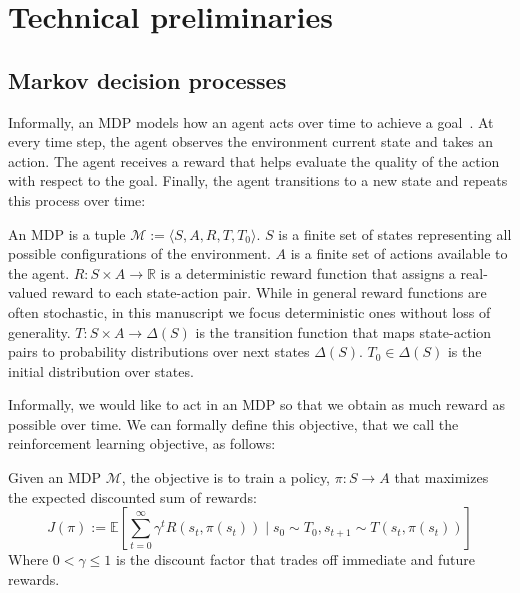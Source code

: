 \section{Technical preliminaries}\label{sec:prelims}


\subsection{Markov decision processes}

Informally, an MDP models how an agent acts over time to achieve a goal~\citep{Bellman,puterman}. 
At every time step, the agent observes the environment current state and takes an action.
The agent receives a reward that helps evaluate the quality of the action with respect to the goal.
Finally, the agent transitions to a new state and repeats this process over time:
\begin{definition}\label{def:mdp} An MDP is a tuple $\mathcal{M} := \langle S, A, R, T, T_0 \rangle$.
$S$ is a finite set of states representing all possible configurations of the environment.
$A$ is a finite set of actions available to the agent.
$R: S \times A \rightarrow \mathbb{R}$ is a deterministic reward function that assigns a real-valued reward to each state-action pair. While in general reward functions are often stochastic, in this manuscript we focus deterministic ones without loss of generality.
$T: S \times A \rightarrow \Delta(S)$ is the transition function that maps state-action pairs to probability distributions over next states $\Delta(S)$.
$T_0 \in \Delta(S)$ is the initial distribution over states.
\end{definition}

Informally, we would like to act in an MDP so that we obtain as much reward as possible over time.
We can formally define this objective, that we call the reinforcement learning objective, as follows:

\begin{definition}\label{def:mdp-obj} Given an MDP $\mathcal{M}$, the objective is to train a policy, $\pi: S \rightarrow A$ that maximizes the expected discounted sum of rewards:
{\small
$$J(\pi) := \mathbb{E}\left[\sum_{t=0}^{\infty} \gamma^t R(s_t, \pi(s_t)) \mid s_0 \sim T_0, s_{t+1} \sim T(s_t, \pi(s_t))\right]$$}
Where $0< \gamma\leq 1$ is the discount factor that trades off immediate and future rewards.
\end{definition}

